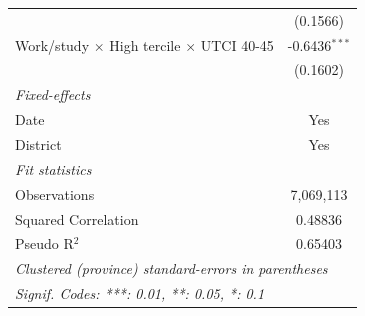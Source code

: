 \begin{table}[htbp]
\begin{tabular}{lc}
                                                                        & (0.1566)\\   
      Work/study $\times$ High tercile $\times$ UTCI 40-45              & -0.6436$^{***}$\\   
                                                                        & (0.1602)\\   
      \midrule
      \emph{Fixed-effects}\\
      Date                                                              & Yes\\  
      District                                                          & Yes\\  
      \midrule
      \emph{Fit statistics}\\
      Observations                                                      & 7,069,113\\  
      Squared Correlation                                               & 0.48836\\  
      Pseudo R$^2$                                                      & 0.65403\\  
      \midrule \midrule
      \multicolumn{2}{l}{\emph{Clustered (province) standard-errors in parentheses}}\\
      \multicolumn{2}{l}{\emph{Signif. Codes: ***: 0.01, **: 0.05, *: 0.1}}\\
   \end{tabular}
\end{table}


